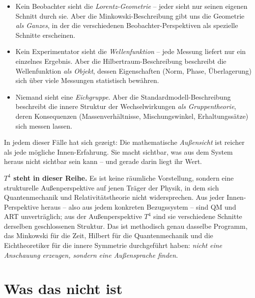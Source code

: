 \begin{itemize}[leftmargin=2em,itemsep=4pt,topsep=4pt]
  \item Kein Beobachter sieht die \emph{Lorentz-Geometrie} -- jeder
        sieht nur seinen eigenen Schnitt durch sie. Aber die
        Minkowski-Beschreibung gibt uns die Geometrie \emph{als
        Ganzes}, in der die verschiedenen Beobachter-Perspektiven
        als spezielle Schnitte erscheinen.

  \item Kein Experimentator sieht die \emph{Wellenfunktion} -- jede
        Messung liefert nur ein einzelnes Ergebnis. Aber die
        Hilbertraum-Beschreibung beschreibt die Wellenfunktion
        \emph{als Objekt}, dessen Eigenschaften (Norm, Phase,
        Überlagerung) sich über viele Messungen statistisch
        bewähren.

  \item Niemand sieht eine \emph{Eichgruppe}. Aber die
        Standardmodell-Beschreibung beschreibt die innere Struktur
        der Wechselwirkungen \emph{als Gruppentheorie}, deren
        Konsequenzen (Massenverhältnisse, Mischungswinkel,
        Erhaltungssätze) sich messen lassen.
\end{itemize}

In jedem dieser Fälle hat sich gezeigt: Die mathematische
\emph{Außensicht} ist reicher als jede mögliche Innen-Erfahrung. Sie
macht sichtbar, was aus dem System heraus nicht sichtbar sein kann --
und gerade darin liegt ihr Wert.

\textbf{$T^4$ steht in dieser Reihe.} Es ist keine räumliche
Vorstellung, sondern eine strukturelle Außenperspektive auf jenen
Träger der Physik, in dem sich Quantenmechanik und
Relativitätstheorie nicht widersprechen. Aus jeder Innen-Perspektive
heraus -- also aus jedem konkreten Bezugssystem -- sind QM und ART
unverträglich; aus der Außenperspektive $T^4$ sind sie verschiedene
Schnitte derselben geschlossenen Struktur. Das ist methodisch genau
dasselbe Programm, das Minkowski für die Zeit, Hilbert für die
Quantenmechanik und die Eichtheoretiker für die innere Symmetrie
durchgeführt haben: \emph{nicht eine Anschauung erzeugen, sondern
eine Außensprache finden}.

\section{Was das nicht ist}

